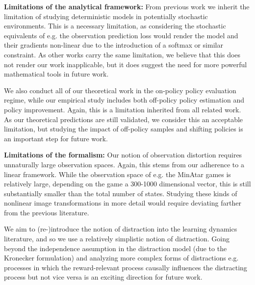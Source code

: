 \textbf{Limitations of the analytical framework:} From previous work \parencite{tang2022understanding,lelan2023bootstrapped} we inherit the limitation of studying deterministic models in potentially stochastic environments.
This is a necessary limitation, as considering the stochastic equivalents of e.g. the observation prediction loss would render the model and their gradients non-linear due to the introduction of a softmax or similar constraint.
As other works carry the same limitation, we believe that this does not render our work inapplicable, but it does suggest the need for more powerful mathematical tools in future work.

We also conduct all of our theoretical work in the on-policy policy evaluation regime, while our empirical study includes both off-policy policy estimation and policy improvement.
Again, this is a limitation inherited from all related work.
As our theoretical predictions are still validated, we consider this an acceptable limitation, but studying the impact of off-policy samples and shifting policies is an important step for future work.

\textbf{Limitations of the formalism:} Our notion of observation distortion requires unnaturally large observation spaces. Again, this stems from our adherence to a linear framework.
While the observation space of e.g. the MinAtar games is relatively large, depending on the game a 300-1000 dimensional vector, this is still substantially smaller than the total number of states.
Studying these kinds of nonlinear image transformations in more detail would require deviating farther from the previous literature.

We aim to (re-)introduce the notion of distraction into the learning dynamics literature, and so we use a relatively simplistic notion of distraction.
Going beyond the independence assumption in the distraction model (due to the Kronecker formulation) and analyzing more complex forms of distractions e.g. processes in which the reward-relevant process causally influences the distracting process but not vice versa is an exciting direction for future work.
